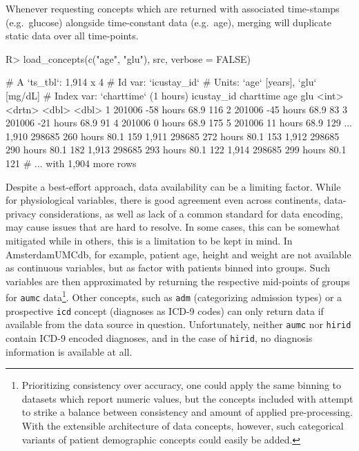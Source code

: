 \documentclass[
  notitle]{jss}
\begin{document}
Whenever requesting concepts which are returned with associated
time-stamps (e.g.~glucose) alongside time-constant data (e.g.~age),
merging will duplicate static data over all time-points.

\begin{CodeChunk}
\begin{CodeInput}
R> load_concepts(c("age", "glu"), src, verbose = FALSE)
\end{CodeInput}
\begin{CodeOutput}
# A `ts_tbl`: 1,914 x 4
# Id var:     `icustay_id`
# Units:      `age` [years], `glu` [mg/dL]
# Index var:  `charttime` (1 hours)
      icustay_id charttime   age   glu
           <int> <drtn>    <dbl> <dbl>
    1     201006 -58 hours  68.9   116
    2     201006 -45 hours  68.9    83
    3     201006 -21 hours  68.9    91
    4     201006   0 hours  68.9   175
    5     201006  11 hours  68.9   129
  ...
1,910     298685 260 hours  80.1   159
1,911     298685 272 hours  80.1   153
1,912     298685 290 hours  80.1   182
1,913     298685 293 hours  80.1   122
1,914     298685 299 hours  80.1   121
# ... with 1,904 more rows
\end{CodeOutput}
\end{CodeChunk}

Despite a best-effort approach, data availability can be a limiting
factor. While for physiological variables, there is good agreement even
across continents, data-privacy considerations, as well as lack of a
common standard for data encoding, may cause issues that are hard to
resolve. In some cases, this can be somewhat mitigated while in others,
this is a limitation to be kept in mind. In AmsterdamUMCdb, for example,
patient age, height and weight are not available as continuous
variables, but as factor with patients binned into groups. Such
variables are then approximated by returning the respective mid-points
of groups for \texttt{aumc} data\footnote{Prioritizing consistency over
  accuracy, one could apply the same binning to datasets which report
  numeric values, but the concepts included with  attempt to
  strike a balance between consistency and amount of applied
  pre-processing. With the extensible architecture of data concepts,
  however, such categorical variants of patient demographic concepts
  could easily be added.}. Other concepts, such as \texttt{adm}
(categorizing admission types) or a prospective \texttt{icd} concept
(diagnoses as ICD-9 codes) can only return data if available from the
data source in question. Unfortunately, neither \texttt{aumc} nor
\texttt{hirid} contain ICD-9 encoded diagnoses, and in the case of
\texttt{hirid}, no diagnosis information is available at all.
\end{document}
